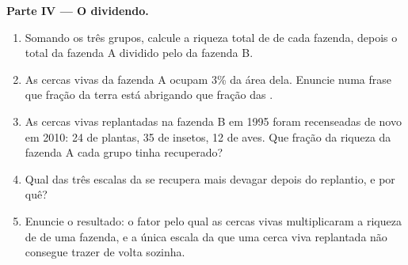 \begin{problem}
\medskip
\noindent\textbf{Parte IV --- O dividendo.}
\begin{enumerate}[resume]
  \item Somando os três grupos, calcule a riqueza total de  de
        cada fazenda, depois o total da fazenda A dividido pelo da
        fazenda B.
  \item As cercas vivas da fazenda A ocupam 3\% da área dela. Enuncie
        numa frase que fração da terra está abrigando que fração das
        .
  \item As cercas vivas replantadas na fazenda B em 1995 foram
        recenseadas de novo em 2010: 24  de plantas, 35 de
        insetos, 12 de aves. Que fração da riqueza da fazenda A cada
        grupo tinha recuperado?
  \item Qual das três escalas da  se recupera mais devagar
        depois do replantio, e por quê?
  \item Enuncie o resultado: o fator pelo qual as cercas vivas
        multiplicaram a riqueza de  de uma fazenda, e a única
        escala da  que uma cerca viva replantada não
        consegue trazer de volta sozinha.
\end{enumerate}
\end{problem}
